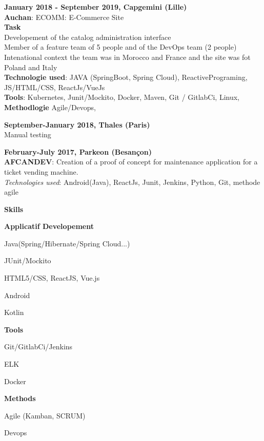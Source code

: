 \documentclass[a4paper,11pt,final]{memoir}
\newcommand\tab[1][1,8cm]{\hspace*{#1}}
\newcommand{\CVSection}[1]
	{\Large\textbf{#1}\par
	\normalsize\normalfont}
\newcommand{\CVItem}[1]
	{\textbf{\color{RoyalBlue} #1}}
\begin{document}
\CVItem{January 2018 - September 2019, Capgemini (Lille) }\\
\textbf{Auchan}: ECOMM:  E-Commerce Site\\
\textbf{Task} \\
 \tab \textbullet  Developement of the catalog administration interface\\
\tab \textbullet  Member of a feature team of 5 people and of the DevOps team (2 people)\\
\tab \textbullet  Intenational context the team was in Morocco and France and the site was fot Poland and Italy\\
 \textbf{Technologie used}: JAVA (SpringBoot, Spring Cloud), ReactivePrograming, JS/HTML/CSS, ReactJs/VueJs  \\
 \textbf{Tools}:  Kubernetes, Junit/Mockito, Docker, Maven, Git / GitlabCi, Linux, \\
 \textbf{Methodlogie}  Agile/Devops,

\CVItem{September-January 2018, Thales (Paris)}\\
Manual testing

\CVItem{February-July 2017, Parkeon (Besançon)}\\
\textbf{AFCANDEV}: Creation of a proof of concept for maintenance application for a ticket vending machine. \\
 \textit{Technologies used}: Android(Java), ReactJs, Junit, Jenkins, Python, Git, methode agile

\CVSection{Skills}
\CVItem{Applicatif Developement}
\begin{multicols}{2}
\begin{compactitem}[\color{RoyalBlue}$\circ$]
	\item Java(Spring/Hibernate/Spring Cloud...)
	\item JUnit/Mockito
	\item HTML5/CSS, ReactJS, Vue.js
	\item Android
	\item Kotlin 
\end{compactitem}
\end{multicols}

\CVItem{Tools }
\begin{multicols}{2}
\begin{compactitem}[\color{RoyalBlue}$\circ$]
	\item Git/GitlabCi/Jenkins
	\item  ELK
	\item  Docker
\end{compactitem}
\end{multicols}
\CVItem{Methods}
\begin{multicols}{2}
\begin{compactitem}[\color{RoyalBlue}$\circ$]
	\item Agile (Kamban, SCRUM)
	\item  Devops
\end{compactitem}
\end{multicols}
\end{document}
